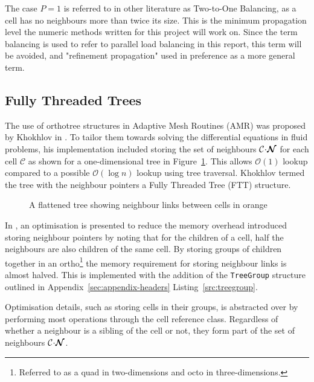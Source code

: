 \documentclass[twoside]{IIBproject}
\newcommand{\vect} [1] {\bm{#1}}
\newcommand{\acc}{{\mkern 0.5mu\cdot\mkern 0.5mu}}
\newcommand{\bigO} [1]{\mathcal{O}(#1)}
\numberwithin{figure}{section}
\begin{document}
            The case $P=1$ is referred to in other literature as Two-to-One Balancing, as a cell has no neighbours more than twice its size. This is the minimum propagation level the numeric methods written for this project will work on. Since the term balancing is used to refer to parallel load balancing in this report, this term will be avoided, and "refinement propagation" used in preference as a more general term.




    \subsection{Fully Threaded Trees} %
        \label{sec:ftt}

        The use of orthotree structures in Adaptive Mesh Routines (AMR) was proposed by Khokhlov in \cite{Khokhlov98}. To tailor them towards solving the differential equations in fluid problems, his implementation included storing the set of neighbours $\mathcal{C}\acc\vect{\mathcal{N}}$ for each cell $\mathcal{C}$ as shown for a one-dimensional tree in Figure~\ref{fig:ftt-neighbours}. This allows $\bigO{1}$ lookup compared to a possible $\bigO{\log n}$ lookup using tree traversal. Khokhlov termed the tree with the neighbour pointers a Fully Threaded Tree (FTT) structure.

        \begin{figure}[!htbp]
            \centering
            
            \caption{A flattened tree showing neighbour links between cells in orange}
            \label{fig:ftt-neighbours}
        \end{figure}

        In \cite{Khokhlov98}, an optimisation is presented to reduce the memory overhead introduced storing neighbour pointers by noting that for the children of a cell, half the neighbours are also children of the same cell. By storing groups of children together in an ortho\footnote{Referred to as a quad in two-dimensions and octo in three-dimensions.} the memory requirement for storing neighbour links is almost halved. This is implemented with the addition of the \texttt{TreeGroup} structure outlined in Appendix~\ref{sec:appendix-headers} Listing~\ref{src:treegroup}. 

        Optimisation details, such as storing cells in their groups, is abstracted over by performing most operations through the cell reference class. Regardless of whether a neighbour is a sibling of the cell or not, they form part of the set of neighbours $\mathcal{C}\acc\vect{\mathcal{N}}$. 
\end{document}
